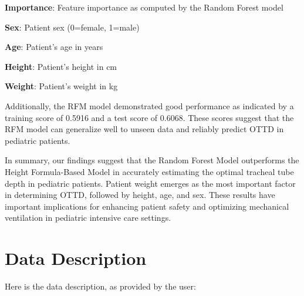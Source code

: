 \documentclass[11pt]{article}
\begin{document}
\begin{table}[h]
\caption{Feature Importance of Random Forest Model (RFM)}
\label{table:rfm_feature_importance}
\begin{threeparttable}
\renewcommand{\TPTminimum}{\linewidth}
\begin{tablenotes}
\footnotesize
\item \textbf{Importance}: Feature importance as computed by the Random Forest model
\item \textbf{Sex}: Patient sex (0=female, 1=male)
\item \textbf{Age}: Patient's age in years
\item \textbf{Height}: Patient's height in cm
\item \textbf{Weight}: Patient's weight in kg
\end{tablenotes}
\end{threeparttable}
\end{table}


Additionally, the RFM model demonstrated good performance as indicated by a training score of 0.5916 and a test score of 0.6068. These scores suggest that the RFM model can generalize well to unseen data and reliably predict OTTD in pediatric patients.

In summary, our findings suggest that the Random Forest Model outperforms the Height Formula-Based Model in accurately estimating the optimal tracheal tube depth in pediatric patients. Patient weight emerges as the most important factor in determining OTTD, followed by height, age, and sex. These results have important implications for enhancing patient safety and optimizing mechanical ventilation in pediatric intensive care settings.


\clearpage
\appendix

\section{Data Description} \label{sec:data_description} Here is the data description, as provided by the user:
\end{document}
